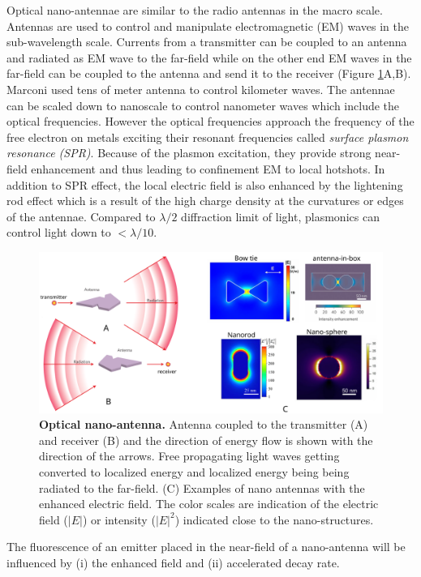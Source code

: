 \documentclass[11pt,a4paper,onecolumn]{article}
\begin{document}
Optical nano-antennae are similar to the radio antennas in the macro scale.
Antennas are used to control and manipulate electromagnetic (EM) waves in the sub-wavelength scale.
Currents from a transmitter can be coupled to an antenna and radiated as EM wave to the far-field while on the other end EM waves in the far-field can be coupled to the antenna and send it to the receiver (Figure \ref{fig:nano_antenna}A,B).
Marconi used tens of meter antenna to control kilometer waves. 
The antennae can be scaled down to nanoscale to control nanometer waves which include the optical frequencies.
However the optical frequencies approach the frequency of the free electron on metals exciting their resonant frequencies called \textit{surface plasmon resonance (SPR)}.
Because of the plasmon excitation, they provide strong near-field enhancement and thus leading to confinement EM to local hotshots.
In addition to SPR effect, the local electric field is also enhanced by the lightening rod effect which is a result of the high charge density at the curvatures or edges of the antennae.
Compared to $\lambda/2$ diffraction limit of light, plasmonics can control light down to ${<}\lambda/10$.
\begin{figure}
	\centering
	\includegraphics[width=\textwidth]{nano_antenna}
	\caption{\textbf{Optical nano-antenna.} Antenna coupled to the transmitter (A) and receiver (B) and the direction of energy flow is shown with the direction of the arrows.
	Free propagating light waves getting converted to localized energy and localized energy being being radiated to the far-field.
	(C) Examples of nano antennas with the enhanced electric field.
	The color scales are indication of the electric field ($|E|$) or intensity ($|E|^2$) indicated close to the nano-structures.}
	\label{fig:nano_antenna}
\end{figure}
The fluorescence of an emitter placed in the near-field of a nano-antenna will be influenced by (i) the enhanced field and (ii) accelerated decay rate.
\end{document}
